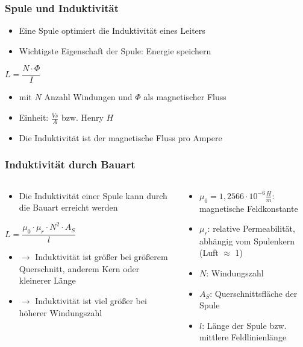 \begin{frame}
\frametitle{Spule und Induktivität}
\begin{itemize}
  \item Eine Spule optimiert die Induktivität eines Leiters
  \item Wichtigste Eigenschaft der Spule: Energie speichern
  \end{itemize}
$L = \dfrac{N\cdot \Phi}{I}$

\begin{itemize}
  \item mit $N$ Anzahl Windungen und $\Phi$ als magnetischer Fluss
  \item Einheit: $\frac{Vs}{A}$ bzw. Henry $H$
  \item Die Induktivität ist der magnetische Fluss pro Ampere
  \end{itemize}

\end{frame}

\begin{frame}
\frametitle{Induktivität durch Bauart}
\begin{columns}
    \begin{column}{0.48\textwidth}
    \begin{itemize}
  \item Die Induktivität einer Spule kann durch die Bauart erreicht werden
  \end{itemize}
$L = \dfrac{\mu_0 \cdot \mu_r \cdot N^2 \cdot A_S}{l}$

\begin{itemize}
  \item $\rightarrow$ Induktivität ist größer bei größerem Querschnitt, anderem Kern oder kleinerer Länge
  \item $\rightarrow$ Induktivität ist viel größer bei höherer Windungszahl
  \end{itemize}

    \end{column}
   \begin{column}{0.48\textwidth}
       \begin{itemize}
  \item $\mu_0 = 1,2566 \cdot 10^{-6}\frac{H}{m}$: magnetische Feldkonstante
  \item $\mu_r$: relative Permeabilität, abhängig vom Spulenkern (Luft  $\approx$  1)
  \item $N$: Windungszahl
  \item $A_S$: Querschnittsfläche der Spule
  \item $l$: Länge der Spule bzw. mittlere Feldlinienlänge
  \end{itemize}

   \end{column}
\end{columns}

\end{frame}


